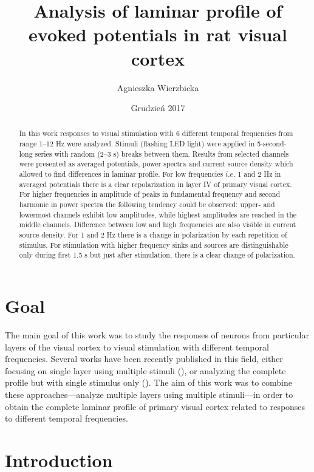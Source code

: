\documentclass{pracalicmgr}
\author{Agnieszka Wierzbicka}
\title{Analysis of laminar profile of evoked potentials in rat visual cortex}
\date{Grudzień 2017}
\begin{document}
    \maketitle
    \let\cleardoublepage\clearpage
    
    \begin{abstract}
    In this work responses to visual stimulation with 6 different temporal frequencies from range 1--12 Hz were analyzed. Stimuli (flashing LED light) were applied in 5-second-long series with random (2--3 s) breaks between them. Results from selected channels were presented as averaged potentials, power spectra and current source density which allowed to find differences in laminar profile. For low frequencies $i.e.$ 1 and 2 Hz in averaged potentials there is a clear repolarization in layer IV of primary visual cortex. For higher frequencies in amplitude of  peaks in fundamental frequency and second harmonic in power spectra the following tendency could be observed: upper- and lowermost channels exhibit low amplitudes, while highest amplitudes are reached in the middle channels. Difference between low and high frequencies are also visible in current source density. For 1 and 2 Hz there is a change in polarization by each repetition of stimulus. For stimulation with higher frequency sinks and sources are distinguishable only during first 1.5 s but just after  stimulation, there is a clear change of polarization.

     \end{abstract}

  
    \tableofcontents
    
    \chapter*{Goal}
    
    The main goal of this work was to study the responses of neurons from particular layers of the visual cortex to visual stimulation with different temporal frequencies. Several works have been recently published in this field, either focusing on single layer using multiple stimuli (\cite{cooke_bear}), or analyzing the complete profile but with single stimulus only (\cite{maier2011}). The aim of this work was to combine these approaches---analyze multiple layers using multiple stimuli---in order to obtain the complete laminar profile of primary visual cortex related to responses to different temporal frequencies.
    

   \chapter{Introduction}
   
\end{document}
